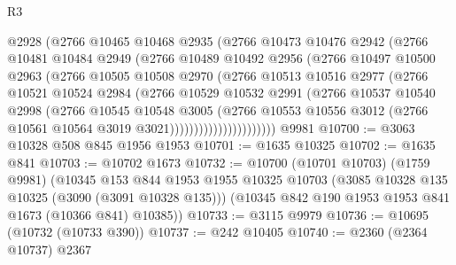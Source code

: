 \begin{lexlean}{R3}
\begin{coremodule}
                      @2928
                      (@2766
                        @10465
                        @10468
                        @2935
                        (@2766
                          @10473
                          @10476
                          @2942
                          (@2766
                            @10481
                            @10484
                            @2949
                            (@2766
                              @10489
                              @10492
                              @2956
                              (@2766
                                @10497
                                @10500
                                @2963
                                (@2766
                                  @10505
                                  @10508
                                  @2970
                                  (@2766
                                    @10513
                                    @10516
                                    @2977
                                    (@2766
                                      @10521
                                      @10524
                                      @2984
                                      (@2766
                                        @10529
                                        @10532
                                        @2991
                                        (@2766
                                          @10537
                                          @10540
                                          @2998
                                          (@2766
                                            @10545
                                            @10548
                                            @3005
                                            (@2766
                                              @10553
                                              @10556
                                              @3012
                                              (@2766 @10561 @10564 @3019 @3021))))))))))))))))))))))
    @9981
@10700 := @3063 @10328 @508 @845 @1956 @1953
@10701 := @1635 @10325
@10702 := @1635 @841
@10703 := @10702 @1673
@10732 := @10700
    (@10701 @10703)
    (@1759 @9981)
    (@10345
      @153
      @844
      @1953
      @1955
      @10325
      @10703
      (@3085 @10328 @135 @10325 (@3090 (@3091 @10328 @135)))
      (@10345 @842 @190 @1953 @1953 @841 @1673 (@10366 @841) @10385))
@10733 := @3115 @9979
@10736 := @10695 (@10732 (@10733 @390))
@10737 := @242 @10405
@10740 := @2360 (@2364 @10737) @2367

\end{coremodule}
\end{lexlean}
